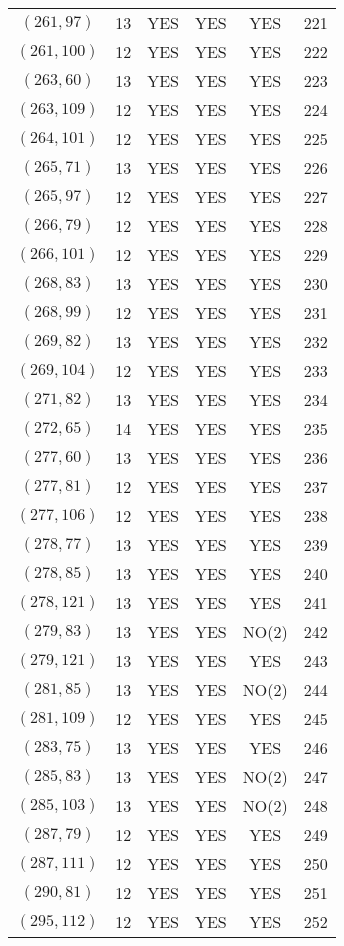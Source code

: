 \begin{longtable}{|c|c|c|c|c|c|}
$(261, 97)$ & 13 & YES & YES & YES & 221\\
$(261, 100)$ & 12 & YES & YES & YES & 222\\
$(263, 60)$ & 13 & YES & YES & YES & 223\\
$(263, 109)$ & 12 & YES & YES & YES & 224\\
$(264, 101)$ & 12 & YES & YES & YES & 225\\
$(265, 71)$ & 13 & YES & YES & YES & 226\\
$(265, 97)$ & 12 & YES & YES & YES & 227\\
$(266, 79)$ & 12 & YES & YES & YES & 228\\
$(266, 101)$ & 12 & YES & YES & YES & 229\\
$(268, 83)$ & 13 & YES & YES & YES & 230\\
$(268, 99)$ & 12 & YES & YES & YES & 231\\
$(269, 82)$ & 13 & YES & YES & YES & 232\\
$(269, 104)$ & 12 & YES & YES & YES & 233\\
$(271, 82)$ & 13 & YES & YES & YES & 234\\
$(272, 65)$ & 14 & YES & YES & YES & 235\\
$(277, 60)$ & 13 & YES & YES & YES & 236\\
$(277, 81)$ & 12 & YES & YES & YES & 237\\
$(277, 106)$ & 12 & YES & YES & YES & 238\\
$(278, 77)$ & 13 & YES & YES & YES & 239\\
$(278, 85)$ & 13 & YES & YES & YES & 240\\
$(278, 121)$ & 13 & YES & YES & YES & 241\\
$(279, 83)$ & 13 & YES & YES & NO(2) & 242\\
$(279, 121)$ & 13 & YES & YES & YES & 243\\
$(281, 85)$ & 13 & YES & YES & NO(2) & 244\\
$(281, 109)$ & 12 & YES & YES & YES & 245\\
$(283, 75)$ & 13 & YES & YES & YES & 246\\
$(285, 83)$ & 13 & YES & YES & NO(2) & 247\\
$(285, 103)$ & 13 & YES & YES & NO(2) & 248\\
$(287, 79)$ & 12 & YES & YES & YES & 249\\
$(287, 111)$ & 12 & YES & YES & YES & 250\\
$(290, 81)$ & 12 & YES & YES & YES & 251\\
$(295, 112)$ & 12 & YES & YES & YES & 252\\

\end{longtable}

